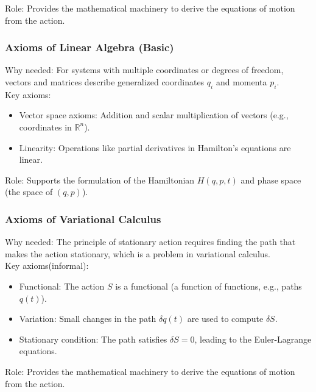 Role: Provides the mathematical machinery to derive the equations of motion from the action.

\subsubsection{Axioms of Linear Algebra (Basic)}
Why needed: For systems with multiple coordinates or degrees of freedom, vectors and matrices describe generalized coordinates $ q_i $ and momenta $ p_i $.
\\
Key axioms:
\begin{itemize}
    \item Vector space axioms: Addition and scalar multiplication of vectors (e.g., coordinates in $ \mathbb{R}^n $).
    \item Linearity: Operations like partial derivatives in Hamilton’s equations are linear.


\end{itemize}
Role: Supports the formulation of the Hamiltonian $ H(q, p, t) $ and phase space (the space of $ (q, p) $).

\subsubsection{Axioms of Variational Calculus}
Why needed: The principle of stationary action requires finding the path that makes the action stationary, which is a problem in variational calculus.
\\
Key axioms(informal):
\begin{itemize}
    \item Functional: The action $ S $ is a functional (a function of functions, e.g., paths $ q(t) $).
    \item Variation: Small changes in the path $ \delta q(t) $ are used to compute $ \delta S $.
    \item Stationary condition: The path satisfies $ \delta S = 0 $, leading to the Euler-Lagrange equations.

\end{itemize}

Role: Provides the mathematical machinery to derive the equations of motion from the action.

